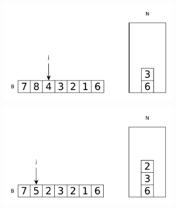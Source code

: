 \begin{figure}
\begin{subfigure}[t]{0.49\textwidth}
\begin{framed}
		\end{framed}
		\caption{}
		\label{fig:next_greater:variation1:stack1}
	 \end{subfigure}
	 \hfill
	 \begin{subfigure}[t]{0.49\textwidth}
		\begin{framed}
			\includegraphics[width=1\linewidth]{sources/next_greater_element/images/stack4}
		\end{framed}
		\caption{}
		\label{fig:next_greater:variation1:stack1}
	 \end{subfigure}
	 \hfill
	 \begin{subfigure}[t]{0.49\textwidth}
		\begin{framed}
			\includegraphics[width=1\linewidth]{sources/next_greater_element/images/stack5}
		\end{framed}
		\caption{}
		\label{fig:next_greater:variation1:stack1}
	 \end{subfigure}
	 \hfill
	 \begin{subfigure}[t]{0.49\textwidth}
		\begin{framed}

\end{framed}
\end{subfigure}
\end{figure}
